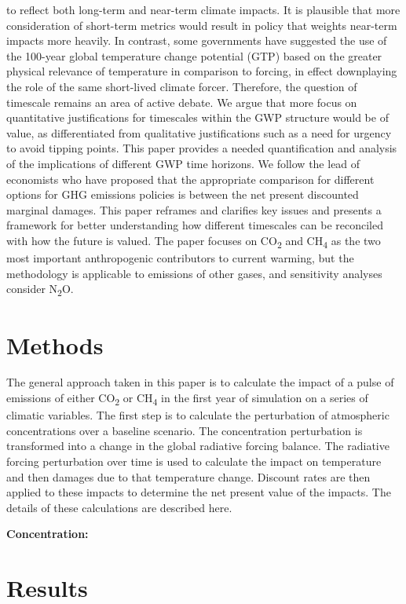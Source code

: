 \documentclass[gc, manuscript]{copernicus}
\begin{document}
to reflect both long-term and near-term climate impacts. It is plausible
that more consideration of short-term metrics would result in policy
that weights near-term impacts more heavily. In contrast, some
governments have suggested the use of the 100-year global temperature
change potential (GTP) based on the greater physical relevance of
temperature in comparison to forcing, in effect downplaying the role of
the same short-lived climate forcer. Therefore, the question of
timescale remains an area of active debate. We argue that more focus on
quantitative justifications for timescales within the GWP structure
would be of value, as differentiated from qualitative justifications
such as a need for urgency to avoid tipping points. This paper provides
a needed quantification and analysis of the implications of different
GWP time horizons. We follow the lead of economists who have proposed
that the appropriate comparison for different options for GHG emissions
policies is between the net present discounted marginal damages. This
paper reframes and clarifies key issues and presents a framework for
better understanding how different timescales can be reconciled with how
the future is valued. The paper focuses on CO\textsubscript{2} and
CH\textsubscript{4} as the two most important anthropogenic contributors
to current warming, but the methodology is applicable to emissions of
other gases, and sensitivity analyses consider N\textsubscript{2}O.

\section{Methods}

The general approach taken in this paper is to calculate the impact of a
pulse of emissions of either CO\textsubscript{2} or CH\textsubscript{4}
in the first year of simulation on a series of climatic variables. The
first step is to calculate the perturbation of atmospheric
concentrations over a baseline scenario. The concentration perturbation
is transformed into a change in the global radiative forcing balance.
The radiative forcing perturbation over time is used to calculate the
impact on temperature and then damages due to that temperature change.
Discount rates are then applied to these impacts to determine the net
present value of the impacts. The details of these calculations are
described here.

\textbf{Concentration:}

\section{Results}
\end{document}
